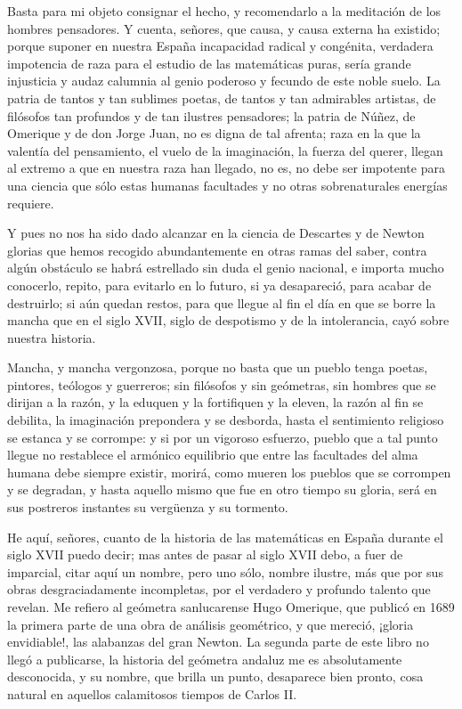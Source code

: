 \documentclass[a4paper, 12pt]{article}
\begin{document}
{{{{Basta para mi objeto consignar el hecho, y recomendarlo a la meditación de los hombres pensadores.  Y cuenta, señores, que causa, y causa externa ha existido; porque suponer en nuestra España incapacidad radical y congénita, verdadera impotencia de raza para el estudio de las matemáticas puras, sería grande injusticia y audaz calumnia al genio poderoso y fecundo de este noble suelo.  La patria de tantos y tan sublimes poetas, de tantos y tan admirables artistas, de filósofos tan profundos y de tan ilustres pensadores; la patria de Núñez, de Omerique y de don Jorge Juan, no es digna de tal afrenta; raza en la que la valentía del pensamiento, el vuelo de la imaginación, la fuerza del querer, llegan al extremo a que en nuestra raza han llegado, no es, no debe ser impotente para una ciencia que sólo estas humanas facultades y no otras sobrenaturales energías requiere. 

Y pues no nos ha sido dado alcanzar en la ciencia de Descartes y de Newton glorias que hemos recogido abundantemente en otras ramas del saber, contra algún obstáculo se habrá estrellado sin duda el genio nacional, e importa mucho conocerlo, repito, para evitarlo en lo futuro, si ya desapareció, para acabar de destruirlo; si aún quedan restos, para que llegue al fin el día en que se borre la mancha que en el siglo XVII, siglo de despotismo y de la intolerancia, cayó sobre nuestra historia.

Mancha, y mancha vergonzosa, porque no basta que un pueblo tenga poetas, pintores, teólogos y guerreros; sin filósofos y sin geómetras, sin hombres que se dirijan a la razón, y la eduquen y la fortifiquen y la eleven, la razón al fin se debilita, la imaginación prepondera y se desborda, hasta el sentimiento religioso se estanca y se corrompe: y si por un vigoroso esfuerzo, pueblo que a tal punto llegue no restablece el armónico equilibrio que entre las facultades del alma humana debe siempre existir, morirá, como mueren los pueblos que se corrompen y se degradan, y hasta aquello mismo que fue en otro tiempo su gloria, será en sus postreros instantes su vergüenza y su tormento.

He aquí, señores, cuanto de la historia de las matemáticas en España durante el siglo XVII puedo decir; mas antes de pasar al siglo XVII debo, a fuer de imparcial, citar aquí un nombre, pero uno sólo, nombre ilustre, más que por sus obras desgraciadamente incompletas, por el verdadero y profundo talento que revelan.  Me refiero al geómetra sanlucarense Hugo Omerique, que publicó en 1689 la primera parte de una obra de análisis geométrico, y que mereció, ¡gloria envidiable!, las alabanzas del gran Newton.  La segunda parte de este libro no llegó a publicarse, la historia del geómetra andaluz me es absolutamente desconocida, y su nombre, que brilla un punto, desaparece bien pronto, cosa natural en aquellos calamitosos tiempos de Carlos II.

}}}}
\end{document}

